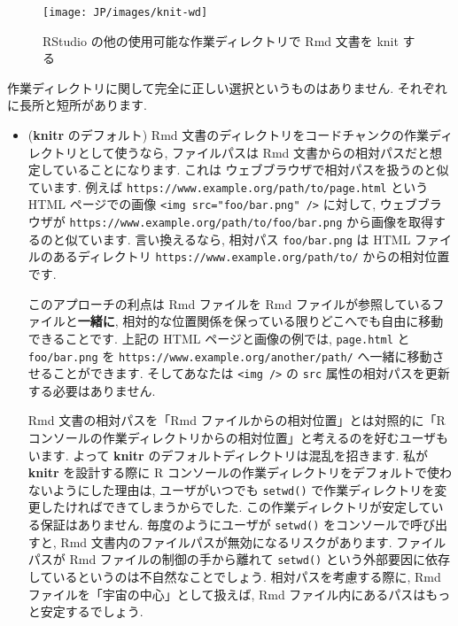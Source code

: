 \documentclass[
  11pt,
  lualatex,ja=standard,jafont=noto]{bxjsreport}
\begin{document}
\begin{figure}

{\centering \texttt{[image: JP/images/knit-wd]} 

}

\caption{RStudio の他の使用可能な作業ディレクトリで Rmd 文書を knit する}\label{fig:knit-wd}
\end{figure}

作業ディレクトリに関して完全に正しい選択というものはありません. それぞれに長所と短所があります.

\begin{itemize}
\item
  (\textbf{knitr} のデフォルト) Rmd 文書のディレクトリをコードチャンクの作業ディレクトリとして使うなら, ファイルパスは Rmd 文書からの相対パスだと想定していることになります. これは ウェブブラウザで相対パスを扱うのと似ています. 例えば \texttt{https://www.example.org/path/to/page.html} という HTML ページでの画像 \texttt{\textless{}img\ src="foo/bar.png"\ /\textgreater{}} に対して, ウェブブラウザが \texttt{https://www.example.org/path/to/foo/bar.png} から画像を取得するのと似ています. 言い換えるなら, 相対パス \texttt{foo/bar.png} は HTML ファイルのあるディレクトリ \texttt{https://www.example.org/path/to/} からの相対位置です.

  このアプローチの利点は Rmd ファイルを Rmd ファイルが参照しているファイルと\textbf{一緒に}, 相対的な位置関係を保っている限りどこへでも自由に移動できることです. 上記の HTML ページと画像の例では, \texttt{page.html} と \texttt{foo/bar.png} を \texttt{https://www.example.org/another/path/} へ一緒に移動させることができます. そしてあなたは \texttt{\textless{}img\ /\textgreater{}} の \texttt{src} 属性の相対パスを更新する必要はありません.

  Rmd 文書の相対パスを「Rmd ファイルからの相対位置」とは対照的に「Rコンソールの作業ディレクトリからの相対位置」と考えるのを好むユーザもいます. よって \textbf{knitr} のデフォルトディレクトリは混乱を招きます. 私が \textbf{knitr} を設計する際に R コンソールの作業ディレクトリをデフォルトで使わないようにした理由は, ユーザがいつでも \texttt{setwd()} で作業ディレクトリを変更したければできてしまうからでした. この作業ディレクトリが安定している保証はありません. 毎度のようにユーザが \texttt{setwd()} をコンソールで呼び出すと, Rmd 文書内のファイルパスが無効になるリスクがあります. ファイルパスが Rmd ファイルの制御の手から離れて \texttt{setwd()} という外部要因に依存しているというのは不自然なことでしょう. 相対パスを考慮する際に, Rmd ファイルを「宇宙の中心」として扱えば, Rmd ファイル内にあるパスはもっと安定するでしょう.


\end{itemize}
\end{document}
